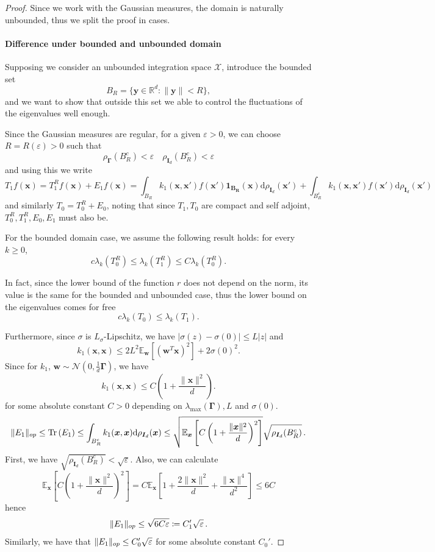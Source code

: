 \begin{proof}
    Since we work with the Gaussian measures, the domain is naturally unbounded, thus we split the proof in cases.
    \item \paragraph{Difference under bounded and unbounded domain}
    Supposing we consider an unbounded integration space $\mathcal X$, introduce the bounded set 
    \[
        B_R = \{\bm y \in \mathbb R^d: \|\bm y\| < R\},
    \]
    and we want to show that outside this set we able to control the fluctuations of the eigenvalues well enough.
    
    Since the Gaussian measures are regular, for a given $\varepsilon > 0$, we can choose $R = R(\varepsilon) > 0$ such that
    \[
        \rho_{\bm \Gamma}(B_R^c) < \varepsilon \quad \rho_{\bm I_d}(B_R^c) < \varepsilon
    \]
    and using this we write
    \[
        T_1 f(\bm x) = T_1^{R}f(\bm x) + E_1f(\bm x) = \int_{B_R} k_1(\bm x, \bm x') f(\bm x') \bm{1_{B_R}}(\bm x)\mathrm d\rho_{\bm I_d}(\bm x') + \int_{B_R^c} k_1(\bm x, \bm x') f(\bm x')\mathrm d\rho_{\bm I_d}(\bm x')
    \]
    and similarly $T_0 = T_0^R + E_0$, noting that since $T_1,T_0$ are compact and self adjoint, $T_0^R, T_1^R, E_0, E_1$ must also be.
    
     
    For the bounded domain case, we assume the following result holds: for every $k \geq 0$,
    \[
        c\lambda_k(T_0^R) \leq \lambda_k(T_1^R) \leq C\lambda_k(T_0^R).
    \]
    
    In fact, since the lower bound of the function $r$ does not depend on the norm, its value is the same for the bounded and unbounded case, thus the lower bound on the eigenvalues comes for free
    \[
        c\lambda_k(T_0) \leq \lambda_k(T_1).
    \]
    
    Furthermore, since $\sigma$ is $L_\sigma$-Lipschitz, we have $|\sigma(z) - \sigma(0)| \leq L|z|$ and
    \[
        k_1(\bm{x}, \bm{x}) \leq 2L^2 \mathbb{E}_{\bm{w}}[(\bm{w}^T \bm{x})^2] + 2\sigma(0)^2.
    \]
    Since for $k_1$, $\bm w \sim \mathcal N(0, \frac{1}{d}\bm \Gamma)$, we have
    \[
         k_1(\bm{x}, \bm{x}) \leq C\left(1+\frac{\|\bm x\|^2}{d}\right).
    \]
    for some absolute constant $C > 0$ depending on $\lambda_{\max}(\bm \Gamma), L$ and $\sigma(0)$.
    \[
        \|E_1\|_{op} \leq \operatorname{Tr}\left({E_1}\right) \leq  \int_{B_R^c} k_1(\bm x, \bm x)\mathrm d\rho_{\bm I_d}(
        \bm x)\leq  \sqrt{\mathbb E_{\bm x}\left[ C\left(1+\frac{\|\bm x\|^2}{d}\right)^2 \right]}\sqrt{\rho_{\bm I_d}(B_R^c)}\, .
    \]
    First, we have $\sqrt{\rho_{\bm I_d}(B_R^c)} < \sqrt \varepsilon$. Also, we can calculate
    \[
        \mathbb E_{\bm x}\left[ C\left(1+\frac{\|\bm x\|^2}{d}\right)^2 \right] =C\mathbb E_{\bm x}\left[1 + \frac{2\|\bm x\|^2}{d}+ \frac{\|\bm x\|^4}{d^2} \right] \leq 6C
    \] 
    hence
    \[
        \|E_1\|_{op} \leq \sqrt {6C \varepsilon} \coloneqq C_1' \sqrt{\varepsilon}\,. 
    \]
    Similarly, we have that $\|E_1\|_{op} \leq C_0'\sqrt{\varepsilon}$ for some absolute constant $C_0'$.


\end{proof}

